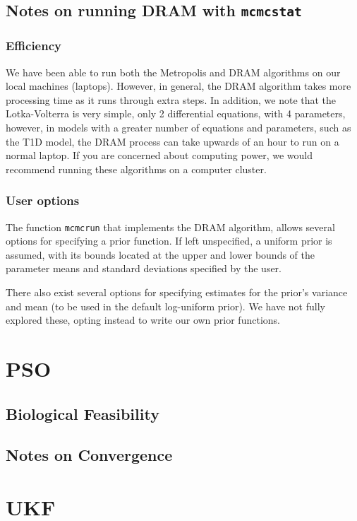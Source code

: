 \begin{appendices}
\begin{tcolorbox}[colback=green!10,colframe=green!25!black,title=\textbf{Calculating and Interpreting Geweke Diagnostic values}]
\end{tcolorbox}

\subsection{Notes on running DRAM with \texttt{mcmcstat}} \label{appendix:runningDRAM}
\subsubsection{Efficiency}  We have been able to run both the Metropolis and DRAM algorithms on our local machines (laptops). However, in general, the DRAM algorithm takes more processing time as it runs through extra steps. In addition, we note that the Lotka-Volterra is very simple, only 2 differential equations, with 4 parameters, however, in models with a greater number of equations and parameters, such as the T1D model, the DRAM process can take upwards of an hour to run on a normal laptop. If you are concerned about computing power, we would recommend running these algorithms on a computer cluster.
\subsubsection{User options}
The function \texttt{mcmcrun} that implements the DRAM algorithm, allows several options for specifying a prior function. If left unspecified, a uniform prior is assumed, with its bounds located at the upper and lower bounds of the parameter means and standard deviations specified by the user.
\par There also exist several options for specifying estimates for the prior's variance and mean (to be used in the default log-uniform prior). We have not fully explored these, opting instead to write our own prior functions.

\section{PSO} \label{PSO_appendix}
\subsection{Biological Feasibility}
\subsection{Notes on Convergence}




\section{UKF} \label{UKF_appendix}

\end{appendices}
